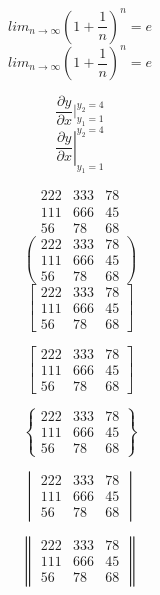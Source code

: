 \documentclass{book}    %
\newcommand{\fc}{\frac}
\begin{document}
	
	$$lim_{n\to\infty}(1+\fc{1}{n})^n=e$$ 
	$$lim_{n\to\infty}\left(1+\fc{1}{n}\right)^n=e$$ %
		
	$$\frac{\partial y}{\partial x}|^{y_2=4}_{y_1=1}$$ 
	$$\left.\frac{\partial y}{\partial x}\right|^{y_2=4}_{y_1=1}$$ 
	
	$$
	\begin{array}{ccc}  %
	222 & 333 & 78 \\ 
	111 & 666 & 45 \\ 
	56 & 78 & 68
	\end{array} 
	$$
	$$
	\left(
	\begin{array}{clr}
	222 & 333 & 78 \\ 
	111 & 666 & 45 \\ 
	56 & 78 & 68
	\end{array} 
	\right)
	$$
	$$
	\left[
	\begin{array}{ccc}
	222 & 333 & 78 \\ 
	111 & 666 & 45 \\ 
	56 & 78 & 68
	\end{array} 
	\right]
	$$	
	
	$$
	\begin{bmatrix}   %
	222 & 333 & 78 \\ 
	111 & 666 & 45 \\ 
	56 & 78 & 68
	\end{bmatrix}
	$$
	
	$$
	\begin{Bmatrix}   %
	222 & 333 & 78 \\ 
	111 & 666 & 45 \\ 
	56 & 78 & 68
	\end{Bmatrix}
	$$
	
	$$
	\begin{vmatrix}   %
	222 & 333 & 78 \\ 
	111 & 666 & 45 \\ 
	56 & 78 & 68
	\end{vmatrix}
	$$
	
	$$
	\begin{Vmatrix}   %
	222 & 333 & 78 \\ 
	111 & 666 & 45 \\ 
	56 & 78 & 68
	\end{Vmatrix}
	$$
	
\end{document}
